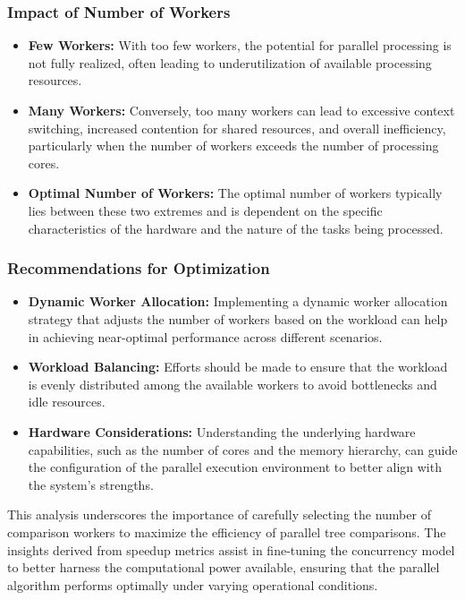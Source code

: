 \documentclass[letterpaper,12pt]{article}
\theoremstyle{remark}
\begin{document}
\subsubsection{Impact of Number of Workers}
\begin{itemize}
    \item \textbf{Few Workers:} With too few workers, the potential for parallel processing is not fully realized, often leading to underutilization of available processing resources.
    \item \textbf{Many Workers:} Conversely, too many workers can lead to excessive context switching, increased contention for shared resources, and overall inefficiency, particularly when the number of workers exceeds the number of processing cores.
    \item \textbf{Optimal Number of Workers:} The optimal number of workers typically lies between these two extremes and is dependent on the specific characteristics of the hardware and the nature of the tasks being processed.
\end{itemize}

\subsubsection{Recommendations for Optimization}
\begin{itemize}
    \item \textbf{Dynamic Worker Allocation:} Implementing a dynamic worker allocation strategy that adjusts the number of workers based on the workload can help in achieving near-optimal performance across different scenarios.
    \item \textbf{Workload Balancing:} Efforts should be made to ensure that the workload is evenly distributed among the available workers to avoid bottlenecks and idle resources.
    \item \textbf{Hardware Considerations:} Understanding the underlying hardware capabilities, such as the number of cores and the memory hierarchy, can guide the configuration of the parallel execution environment to better align with the system’s strengths.
\end{itemize}

This analysis underscores the importance of carefully selecting the number of comparison workers to maximize the efficiency of parallel tree comparisons. The insights derived from speedup metrics assist in fine-tuning the concurrency model to better harness the computational power available, ensuring that the parallel algorithm performs optimally under varying operational conditions.
\end{document}
